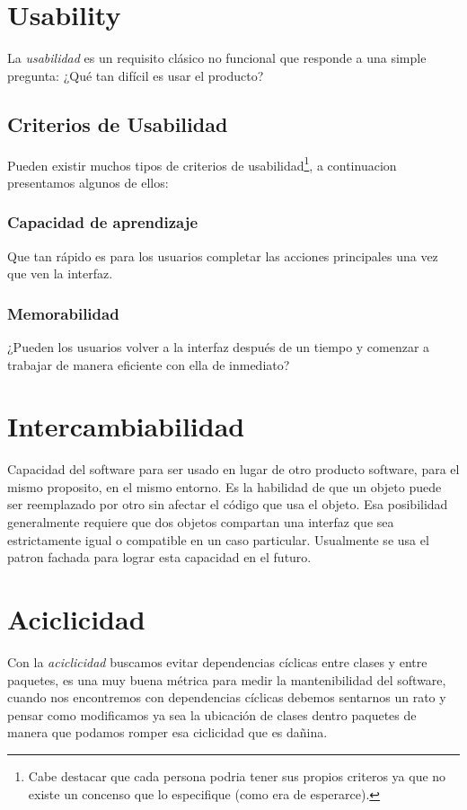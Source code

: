 \documentclass[a4paper,11pt]{article}
\begin{document}
\section{Usability}
La \emph{usabilidad} es un requisito clásico no funcional\cite{USABILITY} que 
responde a una simple pregunta: ¿Qué tan difícil es usar el producto?

\subsection{Criterios de Usabilidad}
Pueden existir muchos tipos de criterios de usabilidad\footnote{Cabe destacar 
que cada persona podria tener sus propios criteros ya que no existe un concenso 
que lo especifique (como era de esperarce).}, a continuacion presentamos 
algunos de ellos:

\subsubsection{Capacidad de aprendizaje}
Que tan rápido es para los usuarios completar las acciones principales una vez 
que ven la interfaz.

\subsubsection{Memorabilidad}
¿Pueden los usuarios volver a la interfaz después de un tiempo y comenzar a 
trabajar de manera eficiente con ella de inmediato?

\section{Intercambiabilidad}
Capacidad del software para ser usado en lugar de otro producto 
software, para el mismo proposito, en el mismo entorno. Es la habilidad de que un 
objeto puede ser reemplazado por otro sin afectar el código que usa el objeto.  
Esa posibilidad generalmente requiere que dos objetos compartan una interfaz que 
sea estrictamente igual o compatible en un caso particular. Usualmente se usa el
patron fachada para lograr esta capacidad en el futuro.

\section{Aciclicidad}
Con la \emph{aciclicidad} buscamos evitar dependencias cíclicas entre clases y 
entre paquetes, es una muy buena métrica para medir la mantenibilidad del 
software, cuando nos encontremos con dependencias cíclicas debemos sentarnos un 
rato y pensar como modificamos ya sea la ubicación de clases dentro paquetes de 
manera que podamos romper esa ciclicidad que es dañina.  
  
\end{document}
